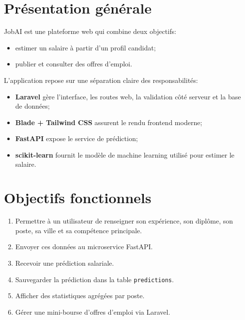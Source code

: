 \documentclass[11pt,a4paper]{article}
\begin{document}
\tableofcontents
\newpage

\section{Pr\'esentation g\'en\'erale}
JobAI est une plateforme web qui combine deux objectifs:
\begin{itemize}[leftmargin=1.2cm]
    \item estimer un salaire \`a partir d'un profil candidat;
    \item publier et consulter des offres d'emploi.
\end{itemize}

L'application repose sur une s\'eparation claire des responsabilit\'es:
\begin{itemize}[leftmargin=1.2cm]
    \item \textbf{Laravel} g\`ere l'interface, les routes web, la validation c\^ot\'e serveur et la base de donn\'ees;
    \item \textbf{Blade + Tailwind CSS} assurent le rendu frontend moderne;
    \item \textbf{FastAPI} expose le service de pr\'ediction;
    \item \textbf{scikit-learn} fournit le mod\`ele de machine learning utilis\'e pour estimer le salaire.
\end{itemize}

\section{Objectifs fonctionnels}
\begin{enumerate}[leftmargin=1.2cm]
    \item Permettre \`a un utilisateur de renseigner son exp\'erience, son dipl\^ome, son poste, sa ville et sa comp\'etence principale.
    \item Envoyer ces donn\'ees au microservice FastAPI.
    \item Recevoir une pr\'ediction salariale.
    \item Sauvegarder la pr\'ediction dans la table \texttt{predictions}.
    \item Afficher des statistiques agr\'eg\'ees par poste.
    \item G\'erer une mini-bourse d'offres d'emploi via Laravel.
\end{enumerate}
\end{document}
